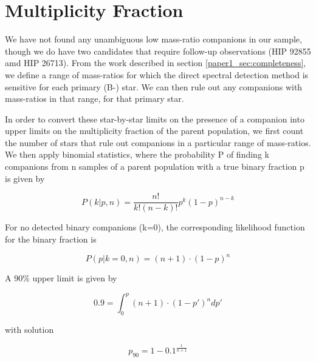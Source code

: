\section{Multiplicity Fraction}
\label{paper1_sec:multiplicity}

We have not found any unambiguous low mass-ratio companions in our
sample, though we do have two candidates that require follow-up
observations (HIP 92855 amd HIP 26713). From the work described in section
\ref{paper1_sec:completeness}, we define a range
of mass-ratios for which the direct spectral detection method is
sensitive for each primary (B-) star. We can then rule out any
companions with mass-ratios in that range, for that primary star.

In order to convert these star-by-star limits on the presence of a
companion into upper limits on the multiplicity
fraction of the parent population, we first count the number of stars
that rule out companions in a particular range of mass-ratios. We then
apply binomial statistics, where the probability P of finding k
companions from n samples of a parent population with a true binary
fraction p is given by

\begin{equation}
P(k|p,n) = \frac{n!}{k!(n-k)!}p^k(1-p)^{n-k}
\label{paper1_eqn:binomial}
\end{equation}

For no detected binary companions (k=0), the corresponding likelihood
function for the binary fraction is

\begin{equation}
P(p|k=0, n) = (n+1)\cdot  (1-p)^n
\label{paper1_eqn:likelihood}
\end{equation}

A $90\%$ upper limit is given by

\begin{equation}
0.9 = \int_0^p (n+1)\cdot  (1-p')^n dp'
\label{paper1_eqn:limitdef}
\end{equation}

with solution

\begin{equation}
p_{90} = 1 - 0.1^{\frac{1}{n+1}}
\label{paper1_eqn:limit}
\end{equation}

